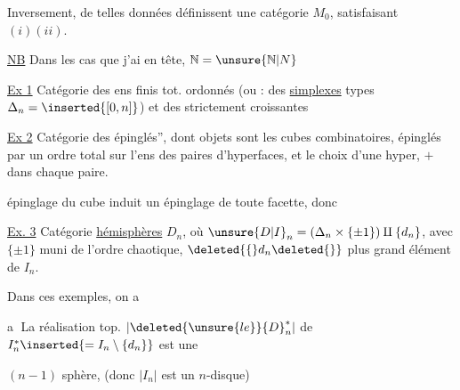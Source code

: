 Inversement, de telles données définissent une catégorie $M_0$, satisfaisant $(i)(ii)$.

\uline{NB} Dans les cas que j'ai en tête, $\mathbb N=\unsure{\mathbb N|N}$

\uline{Ex 1} Catégorie des ens finis tot. ordonnés (ou : des \uline{simplexes} types $\Delta_n=\inserted{[0,n]}$) et des  strictement croissantes

\uline{Ex 2} Catégorie des   épinglés'',  dont  objets sont les  cubes combinatoires,
  épinglés par un ordre total sur l'ens des paires d'hyperfaces,  et le choix d'une hyper,   $+$ dans chaque paire.

 épinglage du cube induit un épinglage de toute facette, donc  

\uline{Ex. 3} Catégorie   \uline{hémisphères} $D_n$, où $ {\unsure{D|I}}_n=(\Delta_n\times\{\pm1\})\amalg\{d_n\}$, avec $\{\pm1\}$ muni de l'ordre chaotique, $\deleted{\{}d_n\deleted{\}}$  plus grand élément de $I_n$.

Dans  ces  exemples, on a

\textcircled{a}  La réalisation top. $|\deleted{\unsure{le}} {D}_n^*|$ de $I_n^*\inserted{=I_n\setminus\{d_n\}}$ est une 

 $(n-1)$ sphère, (donc $|I_n|$ est un $n$-disque)
